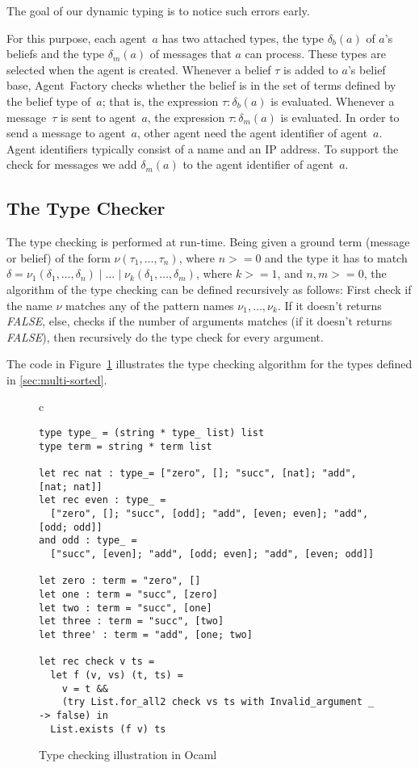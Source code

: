 \documentclass[preprint]{sigplanconf} %
\theoremstyle{remark}
\begin{document}
The goal of our dynamic typing is to notice such errors early.

For this purpose, each agent~$a$ has two attached types, the type
$\delta_b(a)$ of $a$'s beliefs and the type $\delta_m(a)$ of messages that
$a$ can process. These types are selected when the agent is created.
Whenever a belief $\tau$ is added to $a$'s belief base, Agent~Factory
checks whether the belief is in the set of terms defined by the belief type
of~$a$; that is, the expression $\tau:\delta_b(a)$ is evaluated. Whenever a
message~$\tau$ is sent to agent~$a$, the expression $\tau:\delta_m(a)$ is
evaluated. In order to send a message to agent~$a$, other agent need the
agent identifier of agent~$a$. Agent identifiers typically consist of a
name and an IP address. To support the check for messages we add
$\delta_m(a)$ to the agent identifier of agent~$a$.

\subsection{The Type Checker}

The type checking is performed at run-time. Being given a ground term
(message or belief) of the form $\nu(\tau_1,\ldots,\tau_n)$, where $n>=0$
and the type it has to match $\delta = \nu_1(\delta_1, \ldots, \delta_n)
\mid \ldots \mid \nu_k(\delta_1, \ldots, \delta_m)$, where $k >= 1$, and
$n,m >= 0$, the algorithm of the type checking can be defined recursively
as follows: First check if the name $\nu$ matches any of the pattern names
$\nu_1,\ldots, \nu_k$. If it doesn't returns \textit{FALSE}, else, checks
if the number of arguments matches (if it doesn't returns \textit{FALSE}),
then recursively do the type check for every argument. 

The code in Figure~\ref{fig:Type-checker} illustrates the type checking
algorithm for the types defined in \autoref{sec:multi-sorted}.

\begin{figure}\footnotesize %
\begin{center}
\begin{tabular}{c}
\begin{lstlisting}[style=ocaml]
type type_ = (string * type_ list) list
type term = string * term list

let rec nat : type_= ["zero", []; "succ", [nat]; "add", [nat; nat]]
let rec even : type_ =
  ["zero", []; "succ", [odd]; "add", [even; even]; "add", [odd; odd]]
and odd : type_ =
  ["succ", [even]; "add", [odd; even]; "add", [even; odd]]

let zero : term = "zero", []
let one : term = "succ", [zero]
let two : term = "succ", [one]
let three : term = "succ", [two]
let three' : term = "add", [one; two]

let rec check v ts =
  let f (v, vs) (t, ts) =
    v = t &&
    (try List.for_all2 check vs ts with Invalid_argument _ -> false) in
  List.exists (f v) ts
\end{lstlisting}
\end{tabular}
\end{center}
\caption{Type checking illustration in Ocaml}
\label{fig:Type-checker}
\end{figure} %
\end{document}
